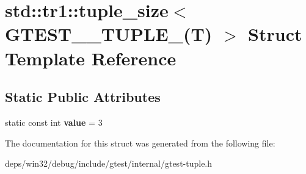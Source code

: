 \hypertarget{structstd_1_1tr1_1_1tuple__size_3_01_g_t_e_s_t__3___t_u_p_l_e___07_t_08_01_4}{}\section{std\+:\+:tr1\+:\+:tuple\+\_\+size$<$ G\+T\+E\+S\+T\+\_\+\_\+\+T\+U\+P\+L\+E\+\_\+(T) $>$ Struct Template Reference}
\label{structstd_1_1tr1_1_1tuple__size_3_01_g_t_e_s_t__3___t_u_p_l_e___07_t_08_01_4}
\subsection*{Static Public Attributes}
\begin{DoxyCompactItemize}
\item 
\hypertarget{structstd_1_1tr1_1_1tuple__size_3_01_g_t_e_s_t__3___t_u_p_l_e___07_t_08_01_4_af48209bd62cc3fd7d8a1e05256da77e5}{}static const int {\bfseries value} = 3\label{structstd_1_1tr1_1_1tuple__size_3_01_g_t_e_s_t__3___t_u_p_l_e___07_t_08_01_4_af48209bd62cc3fd7d8a1e05256da77e5}

\end{DoxyCompactItemize}


The documentation for this struct was generated from the following file\+:\begin{DoxyCompactItemize}
\item 
deps/win32/debug/include/gtest/internal/gtest-\/tuple.\+h\end{DoxyCompactItemize}
